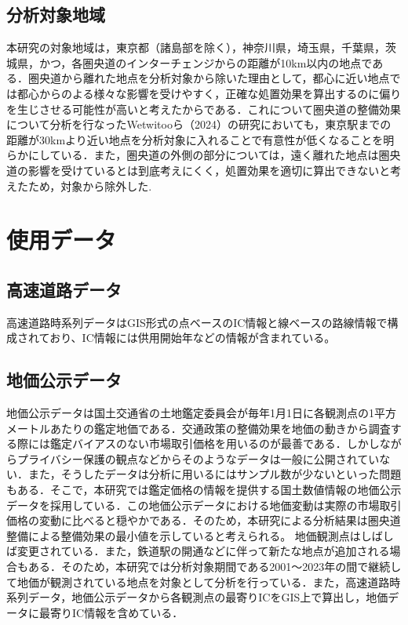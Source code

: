 \subsection{分析対象地域}
本研究の対象地域は，東京都（諸島部を除く），神奈川県，埼玉県，千葉県，茨城県，かつ，各圏央道のインターチェンジからの距離が10km以内の地点である．圏央道から離れた地点を分析対象から除いた理由として，都心に近い地点では都心からのよる様々な影響を受けやすく，正確な処置効果を算出するのに偏りを生じさせる可能性が高いと考えたからである．これについて圏央道の整備効果について分析を行なったWetwitooら（2024）\cite{Weteitoo2024}の研究においても，東京駅までの距離が30kmより近い地点を分析対象に入れることで有意性が低くなることを明らかにしている．また，圏央道の外側の部分については，遠く離れた地点は圏央道の影響を受けているとは到底考えにくく，処置効果を適切に算出できないと考えたため，対象から除外した.

\section{使用データ}
\subsection{高速道路データ}
高速道路時系列データはGIS形式の点ベースのIC情報と線ベースの路線情報で構成されており、IC情報には供用開始年などの情報が含まれている。

\subsection{地価公示データ}
地価公示データは国土交通省の土地鑑定委員会が毎年1月1日に各観測点の1平方メートルあたりの鑑定地価である．交通政策の整備効果を地価の動きから調査する際には鑑定バイアスのない市場取引価格を用いるのが最善である．しかしながらプライバシー保護の観点などからそのようなデータは一般に公開されていない．また，そうしたデータは分析に用いるにはサンプル数が少ないといった問題もある．そこで，本研究では鑑定価格の情報を提供する国土数値情報の地価公示データを採用している．\cite{shimizu2006}\cite{kunimi2021}この地価公示データにおける地価変動は実際の市場取引価格の変動に比べると穏やかである．そのため，本研究による分析結果は圏央道整備による整備効果の最小値を示していると考えられる。
地価観測点はしばしば変更されている．また，鉄道駅の開通などに伴って新たな地点が追加される場合もある．そのため，本研究では分析対象期間である2001～2023年の間で継続して地価が観測されている地点を対象として分析を行っている．また，高速道路時系列データ，地価公示データから各観測点の最寄りICをGIS上で算出し，地価データに最寄りIC情報を含めている．
